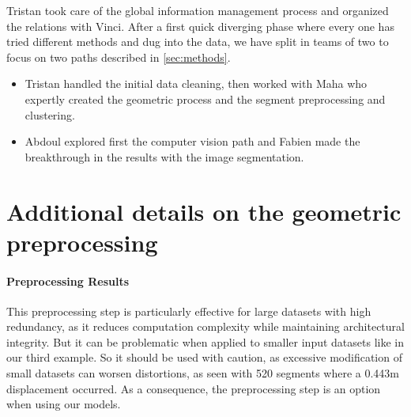 \documentclass[11pt]{article}
\begin{document}
Tristan took care of the global information management process and organized the
relations with Vinci. After a first quick diverging phase where every one has 
tried different methods and dug into the data,  we have split in teams of two 
to focus on two paths described in \cref{sec:methods}. 
\begin{itemize}
    \item Tristan handled the initial data cleaning, then worked with Maha who 
    expertly created the geometric process and the segment preprocessing and clustering.
    \item Abdoul explored first the computer vision path and Fabien made the 
    breakthrough in the results with the image segmentation.
\end{itemize}





\appendix

\newpage
\section{Additional details on the geometric preprocessing}
\label{app:sec:geomdetails}
\paragraph{Preprocessing Results}

This preprocessing step is particularly effective for large datasets with high 
redundancy, as it reduces computation complexity while maintaining architectural 
integrity. But it can be problematic when applied to smaller input datasets like 
in our third example. So it should be used with caution, as excessive modification 
of small datasets can worsen distortions, as seen with 520 segments where a 0.443m 
displacement occurred. As a consequence, the preprocessing step is an option when
using our models.
\end{document}
